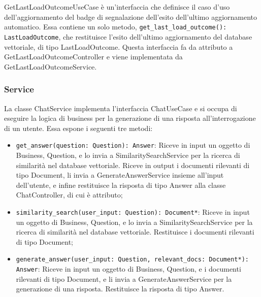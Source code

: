 \label{sec:get_last_load_outcome_use_case}
GetLastLoadOutcomeUseCase è un'interfaccia che definisce il caso d'uso dell'aggiornamento del badge di segnalazione dell'esito dell'ultimo aggiornamento automatico. Essa contiene un solo metodo, \texttt{get\_last\_load\_outcome(): LastLoadOutcome}, che restituisce l'esito dell'ultimo aggiornamento del database vettoriale, di tipo LastLoadOutcome. Questa interfaccia fa da attributo a GetLastLoadOutcomeController e viene implementata da GetLastLoadOutcomeService.

\newpage


\subsubsection{Service}
\label{sec:service_backend}

\label{sec:chat_service_backend}
La classe ChatService implementa l'interfaccia ChatUseCase e si occupa di eseguire la logica di business per la generazione di una risposta all'interrogazione di un utente.
Essa espone i seguenti tre metodi:
\begin{itemize}
    \item \texttt{get\_answer(question: Question): Answer}: Riceve in input un oggetto di Business, Question, e lo invia a SimilaritySearchService per la ricerca di similarità nel database vettoriale. Riceve in output i documenti rilevanti di tipo Document, li invia a GenerateAnswerService insieme all'input dell'utente, e infine restituisce la risposta di tipo Answer alla classe ChatController, di cui è attributo;
    \item \texttt{similarity\_search(user\_input: Question): Document*}: Riceve in input un oggetto di Business, Question, e lo invia a SimilaritySearchService per la ricerca di similarità nel database vettoriale. Restituisce i documenti rilevanti di tipo Document;
    \item \texttt{generate\_answer(user\_input: Question, relevant\_docs: Document*): Answer}: Riceve in input un oggetto di Business, Question, e i documenti rilevanti di tipo Document, e li invia a GenerateAnswerService per la generazione di una risposta. Restituisce la risposta di tipo Answer.
\end{itemize}


